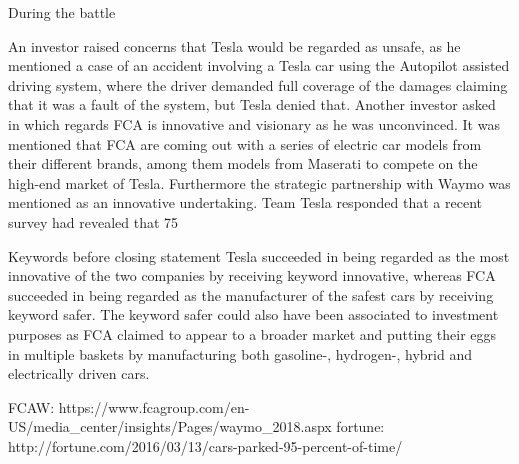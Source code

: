During the battle

An investor raised concerns that Tesla would be regarded as unsafe, as he mentioned a case of an accident involving a Tesla car using the Autopilot assisted driving system, where the driver demanded full coverage of the damages claiming that it was a fault of the system, but Tesla denied that. Another investor asked in which regards FCA is innovative and visionary as he was unconvinced. It was mentioned that FCA are coming out with a series of electric car models from their different brands, among them models from Maserati to compete on the high-end market of Tesla. Furthermore the strategic partnership with Waymo was mentioned as an innovative undertaking. Team Tesla responded that a recent survey had revealed that 75%

Keywords before closing statement
Tesla succeeded in being regarded as the most innovative of the two companies by receiving keyword innovative, whereas FCA succeeded in being regarded as the manufacturer of the safest cars by receiving keyword safer. The keyword safer could also have been associated to investment purposes as FCA claimed to appear to a broader market and putting their eggs in multiple baskets by manufacturing both gasoline-, hydrogen-, hybrid and electrically driven cars.

FCAW: https://www.fcagroup.com/en-US/media_center/insights/Pages/waymo_2018.aspx
fortune: http://fortune.com/2016/03/13/cars-parked-95-percent-of-time/